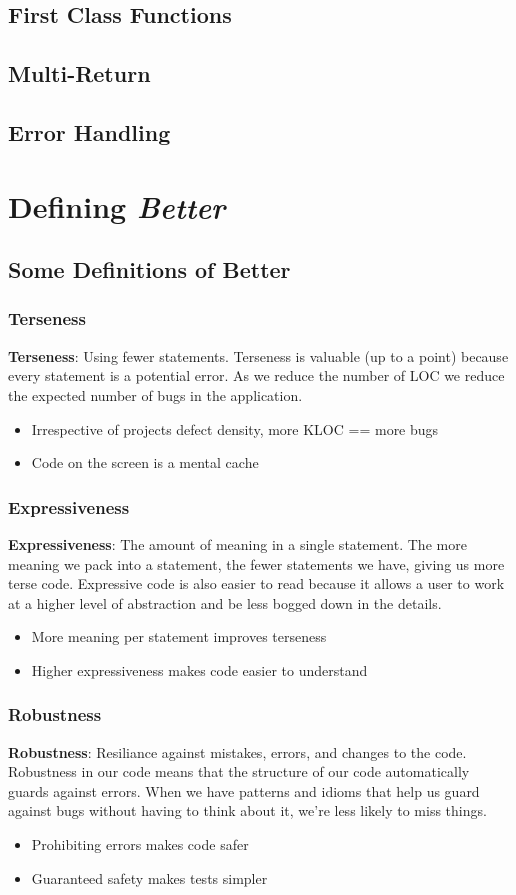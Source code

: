 \documentclass{beamer}
\begin{document}
\subsection{First Class Functions}
\subsection{Multi-Return}
\subsection{Error Handling}
\section{Defining \emph{Better}}
\subsection{Some Definitions of Better}
\begin{frame}
  \frametitle{Terseness}
  {\bf Terseness}: Using fewer statements.
  \vfill
  Terseness is valuable (up to a point) because every statement is a
  potential error.  As we reduce the number of LOC we reduce the
  expected number of bugs in the application.
  \vfill
  \begin{itemize}
  \item Irrespective of projects defect density, more KLOC == more bugs
  \item Code on the screen is a mental cache
  \end{itemize}
\end{frame}

\begin{frame}
  \frametitle{Expressiveness}
  {\bf Expressiveness}: The amount of meaning in a single statement.
  \vfill
  The more meaning we pack into a statement, the fewer statements we
  have, giving us more terse code.  Expressive code is also easier to
  read because it allows a user to work at a higher level of
  abstraction and be less bogged down in the details.
  \vfill
  \begin{itemize}
  \item More meaning per statement improves terseness
  \item Higher expressiveness makes code easier to understand
  \end{itemize}
\end{frame}

\begin{frame}
  \frametitle{Robustness}
  {\bf Robustness}: Resiliance against mistakes, errors, and changes to the code.
  \vfill
  Robustness in our code means that the structure of our code
  automatically guards against errors.  When we have patterns and
  idioms that help us guard against bugs without having to think about
  it, we're less likely to miss things.
  \vfill
  \begin{itemize}
  \item Prohibiting errors makes code safer
  \item Guaranteed safety makes tests simpler
  \end{itemize}
\end{frame}
\end{document}

